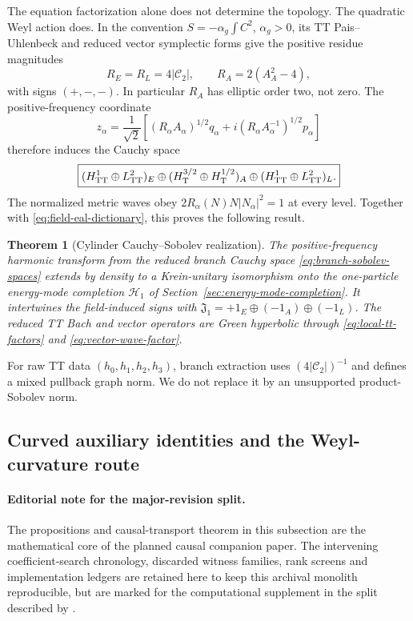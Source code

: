 \documentclass[11pt]{article}
\newtheorem{theorem}{Theorem}[section]
\theoremstyle{definition}
\theoremstyle{remark}
\begin{document}
The equation factorization alone does not determine the topology.  The
quadratic Weyl action does.  In the convention
$S=-\alpha_g\int C^2$, $\alpha_g>0$, its TT Pais--Uhlenbeck and reduced
vector symplectic forms give the positive residue magnitudes
\begin{equation}\label{eq:branch-residues}
 R_E=R_L=4|\mathcal C_2|,\qquad
 R_A=2(A_A^2-4),
\end{equation}
with signs $(+,-,-)$.  In particular $R_A$ has elliptic order two, not
zero.  The positive-frequency coordinate
\begin{equation}
 z_\alpha=\frac1{\sqrt2}
 \left[(R_\alpha A_\alpha)^{1/2}q_\alpha
 +i(R_\alpha A_\alpha^{-1})^{1/2}p_\alpha\right]
\end{equation}
therefore induces the Cauchy space
\begin{equation}\label{eq:branch-sobolev-spaces}
 \boxed{
 (H^1_{\rm TT}\oplus L^2_{\rm TT})_E
 \oplus(H^{3/2}_{\rm T}\oplus H^{1/2}_{\rm T})_A
 \oplus(H^1_{\rm TT}\oplus L^2_{\rm TT})_L.}
\end{equation}
The normalized metric waves obey
$2R_\alpha(N)N|N_\alpha|^2=1$ at every level.  Together with
\eqref{eq:field-eal-dictionary}, this proves the following result.

\begin{theorem}[Cylinder Cauchy--Sobolev realization]
\label{thm:cauchy-sobolev}
The positive-frequency harmonic transform from the reduced branch Cauchy
space \eqref{eq:branch-sobolev-spaces} extends by density to a Krein-unitary
isomorphism onto the one-particle energy-mode completion $\mathscr H_1$ of
Section~\ref{sec:energy-mode-completion}.  It intertwines the field-induced
signs with
$\mathfrak J_1=+1_E\oplus(-1_A)\oplus(-1_L)$.
The reduced TT Bach and vector operators are Green hyperbolic through
\eqref{eq:local-tt-factors} and \eqref{eq:vector-wave-factor}.
\end{theorem}

For raw TT data $(h_0,h_1,h_2,h_3)$, branch extraction uses
$(4|\mathcal C_2|)^{-1}$ and defines a mixed pullback graph norm.  We do not
replace it by an unsupported product-Sobolev norm.

\subsection{Curved auxiliary identities and the Weyl-curvature route}

\paragraph{Editorial note for the major-revision split.}
The propositions and causal-transport theorem in this subsection are the
mathematical core of the planned causal companion paper.  The intervening
coefficient-search chronology, discarded witness families, rank screens and
implementation ledgers are retained here to keep this archival monolith
reproducible, but are marked for the computational supplement in the split
described by .
\label{sec:auxiliary-green-witness}
\end{document}
